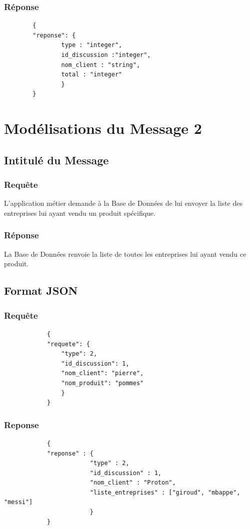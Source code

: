 \documentclass[a4paper, 11pt]{article}
\begin{document}
        \subsubsection{Réponse}
        \begin{verbatim}
        {
        "reponse": {
                type : "integer",
                id_discussion :"integer",
                nom_client : "string",
                total : "integer"
                }
        }
        \end{verbatim}
\section{Modélisations du Message 2}
    \subsection{Intitulé du Message}
        \subsubsection{Requête} 
        L'application métier demande à la Base de Données de lui envoyer la liste des entreprises lui ayant vendu un produit spécifique.
        \subsubsection{Réponse}
        La Base de Données renvoie la liste de toutes les entreprises lui ayant vendu ce produit.
    \subsection{Format JSON}
        \subsubsection{Requête}
        \begin{verbatim}
            {
            "requete": {
                "type": 2,
                "id_discussion": 1,
                "nom_client": "pierre",
                "nom_produit": "pommes"
                }
            }
        \end{verbatim}
            
        \subsubsection{Reponse}
        \begin{verbatim}
            {
            "reponse" : {
                        "type" : 2,
                        "id_discussion" : 1,
                        "nom_client" : "Proton",
                        "liste_entreprises" : ["giroud", "mbappe", "messi"]
                        }
            }
        \end{verbatim}
\end{document}
